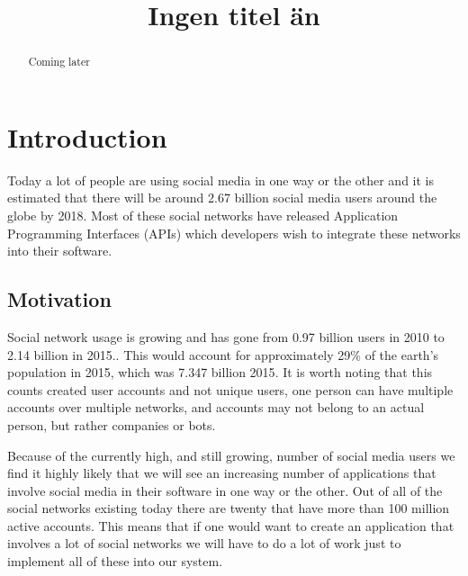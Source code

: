 \documentclass{sigchi}
\def\plaintitle{Ingen titel än}
\begin{document}
\title{\plaintitle}
\author{
}

\maketitle

\begin{abstract}
Coming later
\end{abstract}

\section{Introduction}
Today a lot of people are using social media in one way or the other and it is estimated that there will be around 2.67 billion social media
users around the globe by 2018\cite{STATISTA_SN_WORLD_USERS}. Most of these social networks have released Application Programming Interfaces (APIs)
which developers wish to integrate these networks into their software.
\subsection{Motivation}
Social network usage is growing and has gone from 0.97 billion users in 2010 to 2.14 billion in 2015.\cite{STATISTA_SN_WORLD_USERS}. This would
account for approximately 29\% of the earth's population in 2015, which was 7.347 billion 2015\cite{WORLD_BANK_POPULATION}. It is worth noting
that this counts created user accounts and not unique users, one person can have multiple accounts over multiple networks, and accounts may not
belong to an actual person, but rather companies or bots.

Because of the currently high, and still growing, number of social media users we find it highly likely that we will see an increasing number of
applications that involve social media in their software in one way or the other. Out of all of the social networks existing today there are twenty
that have more than 100 million active accounts\cite{STATISTA_LEADING_SOCIAL_NETWORKS}. This means that if one would want to create an application
that involves a lot of social networks we will have to do a lot of work just to implement all of these into our system.
\end{document}

